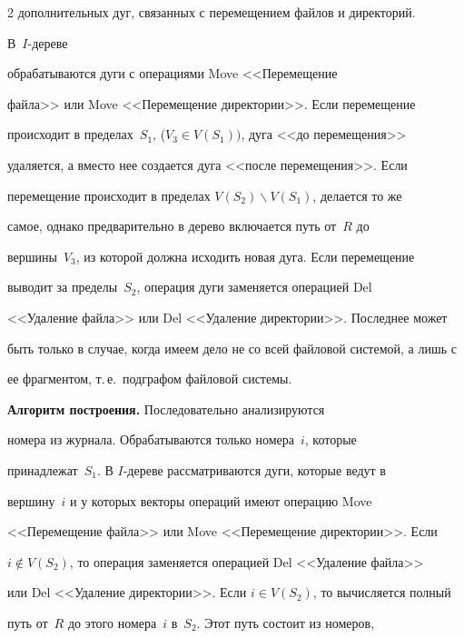 \begin{multicols}{2}
дополнительных дуг, связанных с перемещением файлов и директорий. 


      В~$I$-дереве\linebreak


      обрабатываются дуги с операциями Move <<Перемещение 


файла>> или Move <<Перемещение директории>>. Если перемещение 


происходит в пределах~$S_1$, ($V_3\in V(S_1))$, дуга <<до перемещения>>\linebreak 


удаляется, а вместо нее создается дуга <<после перемещения>>. Если 


перемещение происходит в пределах $V(S_2)\backslash V(S_1)$, делается то же 


самое, однако предварительно в дерево включается путь от~$R$ до 


вершины~$V_3$, из которой должна исходить новая дуга. Если перемещение 


выводит за пределы~$S_2$, операция дуги заменяется операцией Del 


<<Удаление файла>> или Del <<Удаление директории>>. Последнее может 


быть только в случае, когда имеем дело не со всей файловой системой, а лишь с 


ее фрагментом, т.\,е.\ подграфом файловой системы.


      


            \smallskip


            


            \noindent


      \textbf{Алгоритм построения.} Последовательно анализируются 


номера из журнала. Обрабатываются только номера~$i$, которые 


принадлежат~$S_1$. В $I$-дереве рассматриваются  дуги, которые ведут в 


вершину~$i$ и у которых векторы операций имеют операцию Move 


<<Перемещение файла>> или Move <<Перемещение директории>>. Если  


$i\notin V(S_2)$, то операция заменяется операцией Del <<Удаление файла>> 


или Del <<Удаление директории>>. Если  $i\in V(S_2)$, то вычисляется полный 


путь от~$R$ до этого номера~$i$ в~$S_2$. Этот путь состоит из номеров, 



\end{multicols}
